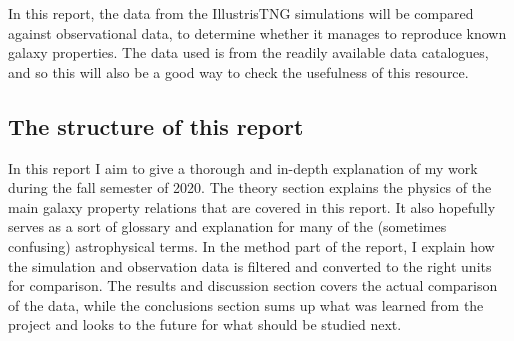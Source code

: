 In this report, the data from the IllustrisTNG simulations will be compared against observational data, to determine whether it manages to reproduce known galaxy properties. The data used is from the readily available data catalogues, and so this will also be a good way to check the usefulness of this resource.


\subsection{The structure of this report}
In this report I aim to give a thorough and in-depth explanation of my work during the fall semester of 2020. The theory section explains the physics of the main galaxy property relations that are covered in this report. It also hopefully serves as a sort of glossary and explanation for many of the (sometimes confusing) astrophysical terms. In the method part of the report, I explain how the simulation and observation data is filtered and converted to the right units for comparison. The results and discussion section covers the actual comparison of the data, while the conclusions section sums up what was learned from the project and looks to the future for what should be studied next.